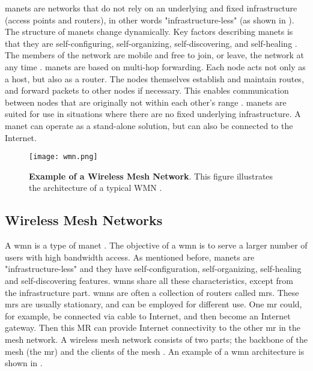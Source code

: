 \glspl{manet} are networks that do not rely on an underlying and fixed infrastructure (access points and routers), in other words "infrastructure-less" (as shown in ). The structure of \glspl{manet} change dynamically. Key factors describing \glspl{manet} is that they are self-configuring, self-organizing, self-discovering, and self-healing \cite{wmn}. The members of the network are mobile and free to join, or leave, the network at any time \cite{adhoc2}. \glspl{manet} are based on multi-hop forwarding. Each node acts not only as a host, but also as a router. The nodes themselves establish and maintain routes, and forward packets to other nodes if necessary. This enables communication between nodes that are originally not within each other's range \cite{adhoc2}. \glspl{manet} are suited for use in situations where there are no fixed underlying infrastructure. A \gls{manet} can operate as a stand-alone solution, but can also be connected to the Internet. 

\begin{figure}[t]
  \centering
    \texttt{[image: wmn.png]}
     \caption [Example of a Wireless Mesh Network]{\textbf{Example of a Wireless Mesh Network}. This figure illustrates the architecture of a typical WMN \cite{wmn}.}
\label{fig:wmn}
\end{figure}

\subsection{Wireless Mesh Networks}
\label{subsec:mesh}
A \gls{wmn} is a type of \gls{manet} \cite{wmn}. The objective of a \gls{wmn} is to serve a larger number of users with high bandwidth access. As mentioned before, \glspl{manet} are "infrastructure-less" and they have self-configuration, self-organizing, self-healing and self-discovering features. \glspl{wmn} share all these characteristics, except from the infrastructure part. \glspl{wmn} are often a collection of routers called \glspl{mr}. These \glspl{mr} are usually stationary, and can be employed for different use. One \gls{mr} could, for example, be connected via cable to Internet, and then become an Internet gateway. Then this MR can provide Internet connectivity to the other \gls{mr} in the mesh network. A wireless mesh network consists of two parts; the backbone of the mesh (the \gls{mr}) and the clients of the mesh \cite{wmn}. An example of a \gls{wmn} architecture is shown in . 


